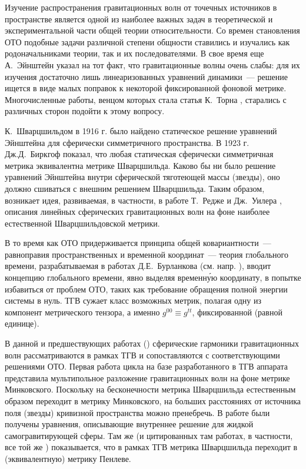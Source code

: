 \documentclass[\docroot/reports/draft/report.tex]{subfiles}
\begin{document}
\onlyinsubfile{\tableofcontents}

Изучение распространения гравитационных волн от точечных источников в пространстве является одной из наиболее важных задач в теоретической и экспериментальной части общей теории относительности. Со времен становления ОТО подобные задачи различной степени общности ставились и изучались как родоначальниками теории, так и их последователями. В свое время еще А.~Эйнштейн \cite{einstein_grav_waves} указал на тот факт, что гравитационные волны очень слабы: для их изучения достаточно лишь линеаризованных уравнений динамики~--- решение ищется в виде малых поправок к некоторой фиксированной фоновой метрике. Многочисленные работы, венцом которых стала статья К.~Торна \cite{thorne_multipole}, старались с различных сторон подойти к этому вопросу.

К.~Шварцшильдом в 1916 г. \cite{schwarzschild_free_space_rus} было найдено статическое решение уравнений Эйнштейна для сферически симметричного пространства. В 1923 г. Дж.Д.~Биркгоф показал, что любая статическая сферически симметричная метрика эквивалентна метрике Шварцшильда. Каково бы ни было решение уравнений Эйнштейна внутри сферической тяготеющей массы (звезды), оно должно сшиваться с внешним решением Шварцшильда. Таким образом, возникает идея, развиваемая, в частности, в работе Т.~Редже и Дж.~Уилера \cite{regge_wheeler_1957}, описания линейных сферических гравитационных волн на фоне наиболее естественной Шварцшильдовской метрики.

В то время как ОТО придерживается принципа общей ковариантности~--- равноправия пространственных и временной координат~--- теория глобального времени, разрабатываемая в работах Д.Е.~Бурланкова (см. напр. \cite{burlankov_space_dynamics,burlankov_grav_waves}), вводит концепцию глобального времени, явно выделяя временн\'{у}ю координату, в попытке избавиться от проблем ОТО, таких как требование обращения полной энергии системы в нуль. ТГВ сужает класс возможных метрик, полагая одну из компонент метрического тензора, а именно $g^{00} \equiv g^{tt}$, фиксированной (равной единице).

В данной и предшествующих работах (\hspace{1sp}\cite{Vas2018b,Vas2019a}) сферические гармоники гравитационных волн рассматриваются в рамках ТГВ и сопоставляются с соответствующими решениями ОТО. Первая работа цикла \cite{Vas2018b} на базе разработанного в ТГВ аппарата представила мультипольное разложение гравитационных волн на фоне метрике Минковского. Поскольку на бесконечности метрика Шварцшильда естественным образом переходит в метрику Минковского, на больших расстояниях от источника поля (звезды) кривизной пространства можно пренебречь. В работе \cite{Vas2019a} были получены уравнения, описывающие внутреннее решение для жидкой самогравитирующей сферы. Там же (и цитированных там работах, в частности, все той же \cite{burlankov_space_dynamics}) показывается, что в рамках ТГВ метрика Шварцшильда переходит в (эквивалентную) метрику Пенлеве.
\end{document}
